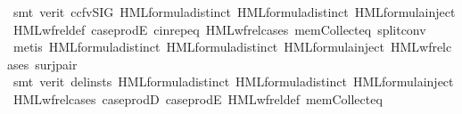 \begin{isabellebody}
\ {\isacharparenleft}{\kern0pt}smt\ {\isacharparenleft}{\kern0pt}verit{\isacharcomma}{\kern0pt}\ ccfv{\isacharunderscore}{\kern0pt}SIG{\isacharparenright}{\kern0pt}\ HML{\isacharunderscore}{\kern0pt}formula{\isachardot}{\kern0pt}distinct{\isacharparenleft}{\kern0pt}{}{\isacharparenright}{\kern0pt}\ HML{\isacharunderscore}{\kern0pt}formula{\isachardot}{\kern0pt}distinct{\isacharparenleft}{\kern0pt}{}{\isacharparenright}{\kern0pt}\ HML{\isacharunderscore}{\kern0pt}formula{\isachardot}{\kern0pt}inject{\isacharparenleft}{\kern0pt}{}{\isacharparenright}{\kern0pt}\ HML{\isacharunderscore}{\kern0pt}wf{\isacharunderscore}{\kern0pt}rel{\isacharunderscore}{\kern0pt}def\ case{\isacharunderscore}{\kern0pt}prodE{\isacharprime}{\kern0pt}\ cin{\isachardot}{\kern0pt}rep{\isacharunderscore}{\kern0pt}eq\ HML{\isacharunderscore}{\kern0pt}wf{\isacharunderscore}{\kern0pt}rel{\isachardot}{\kern0pt}cases\ mem{\isacharunderscore}{\kern0pt}Collect{\isacharunderscore}{\kern0pt}eq\ split{\isacharunderscore}{\kern0pt}conv{\isacharparenright}{\kern0pt}\isanewline
\ \ \ \ \isamarkupfalse%
\ {\isacharparenleft}{\kern0pt}metis\ HML{\isacharunderscore}{\kern0pt}formula{\isachardot}{\kern0pt}distinct{\isacharparenleft}{\kern0pt}{}{\isacharparenright}{\kern0pt}\ HML{\isacharunderscore}{\kern0pt}formula{\isachardot}{\kern0pt}distinct{\isacharparenleft}{\kern0pt}{}{\isacharparenright}{\kern0pt}\ HML{\isacharunderscore}{\kern0pt}formula{\isachardot}{\kern0pt}inject{\isacharparenleft}{\kern0pt}{}{\isacharparenright}{\kern0pt}\ HML{\isacharunderscore}{\kern0pt}wf{\isacharunderscore}{\kern0pt}rel{\isachardot}{\kern0pt}cases\ surj{\isacharunderscore}{\kern0pt}pair{\isacharparenright}{\kern0pt}\isanewline
\ \ \ \ \isamarkupfalse%
\ {\isacharparenleft}{\kern0pt}smt\ {\isacharparenleft}{\kern0pt}verit{\isacharcomma}{\kern0pt}\ del{\isacharunderscore}{\kern0pt}insts{\isacharparenright}{\kern0pt}\ HML{\isacharunderscore}{\kern0pt}formula{\isachardot}{\kern0pt}distinct{\isacharparenleft}{\kern0pt}{}{\isacharparenright}{\kern0pt}\ HML{\isacharunderscore}{\kern0pt}formula{\isachardot}{\kern0pt}distinct{\isacharparenleft}{\kern0pt}{}{\isacharparenright}{\kern0pt}\ HML{\isacharunderscore}{\kern0pt}formula{\isachardot}{\kern0pt}inject{\isacharparenleft}{\kern0pt}{}{\isacharparenright}{\kern0pt}\ HML{\isacharunderscore}{\kern0pt}wf{\isacharunderscore}{\kern0pt}rel{\isachardot}{\kern0pt}cases\ case{\isacharunderscore}{\kern0pt}prodD\ case{\isacharunderscore}{\kern0pt}prodE{\isacharprime}{\kern0pt}\ HML{\isacharunderscore}{\kern0pt}wf{\isacharunderscore}{\kern0pt}rel{\isacharunderscore}{\kern0pt}def\ mem{\isacharunderscore}{\kern0pt}Collect{\isacharunderscore}{\kern0pt}eq{\isacharparenright}{\kern0pt}\isanewline

\end{isabellebody}
